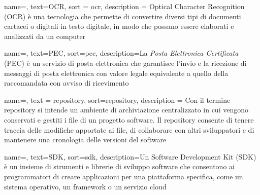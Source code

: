 
 {
    name=,
    text=OCR,
    sort = ocr,
    description = {Optical Character Recognition (OCR) è
    una tecnologia che permette di convertire diversi tipi di documenti cartacei o digitali in testo digitale, in modo che possano essere elaborati e analizzati da un computer}
}

 {
    name=,
    text=PEC,
    sort=pec,
    description={La \emph{Posta Elettronica Certificata} (PEC) è un servizio di posta elettronica che garantisce l'invio e la ricezione di messaggi di posta elettronica con valore legale equivalente a quello della raccomandata con avviso di ricevimento}
}

 {
    name=,
    text = repository,
    sort=repository,
    description = {Con il termine repository si intende un ambiente di archiviazione centralizzato in cui vengono conservati e gestiti i file di un progetto software. Il repository consente di tenere traccia delle modifiche apportate ai file, di collaborare con altri sviluppatori e di mantenere una cronologia delle versioni del software
    }
}


 {
    name=,
    text=SDK,
    sort=sdk,
    description={Un Software Development Kit (SDK) è un insieme di strumenti e librerie di sviluppo software che consentono ai programmatori di creare applicazioni per una piattaforma specifica, come un sistema operativo, un framework o un servizio cloud}
}


